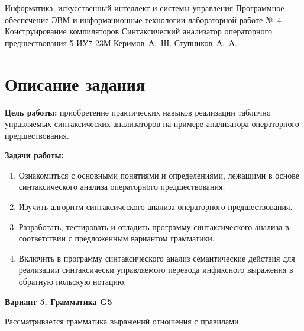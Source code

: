 \documentclass{bmstu-gost-7-32}
\begin{document}
\makereporttitle
	{Информатика, искусственный интеллект и системы управления} %
	{Программное обеспечение ЭВМ и информационные технологии} %
	{лабораторной работе №~4} %
	{Конструирование компиляторов} %
	{Синтаксический анализатор операторного предшествования} %
	{5} %
	{ИУ7-23М} %
	{Керимов~А.~Ш.} %
	{Ступников~А.~А.} %

\section*{Описание задания}

\textbf{Цель работы:} приобретение практических навыков реализации таблично управляемых синтаксических анализаторов на примере анализатора операторного предшествования.

\textbf{Задачи работы:}
\begin{enumerate}
	\item Ознакомиться с основными понятиями и определениями, лежащими в основе синтаксического анализа операторного предшествования.
	\item Изучить алгоритм синтаксического анализа операторного предшествования.
	\item Разработать, тестировать и отладить программу синтаксического анализа в соответствии с предложенным вариантом грамматики.
	\item Включить в программу синтаксического анализ семантические действия для реализации синтаксически управляемого перевода инфиксного выражения в обратную польскую нотацию.
\end{enumerate}

\textbf{Вариант 5. Грамматика G5}

Рассматривается грамматика выражений отношения с правилами
\end{document}
